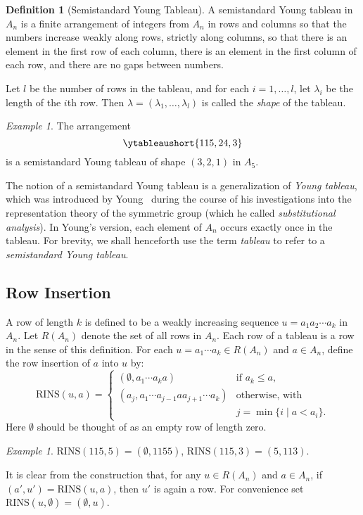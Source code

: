 \documentclass[10pt]{amsproc}
\theoremstyle{definition}
\newtheorem{definition}[theorem]{Definition}
\theoremstyle{remark}
\newtheorem{example}[theorem]{Example}
\newcommand{\rowins}{\mathrm{RINS}}
\begin{document}
\begin{definition}
  [Semistandard Young Tableau]
  \label{definition:ssyt}
  A semistandard Young \linebreak tableau in $A_n$ is a finite arrangement of integers from $A_n$ in rows and columns so that the numbers increase weakly along rows, strictly along columns, so that there is an element in the first row of each column, there is an element in the first column of each row, and there are no gaps between numbers.

  Let $l$ be the number of rows in the tableau, and for each $i=1,\dotsc,l$, let $\lambda_i$ be the length of the $i$th row.
  Then $\lambda=(\lambda_1,\dotsc,\lambda_l)$ is called the \emph{shape} of the tableau.
\end{definition}
\begin{example}
  \label{example:ssyt}
  The arrangement
  \begin{displaymath}
    \ytableaushort{115,24,3}
  \end{displaymath}
  is a semistandard Young tableau of shape $(3,2,1)$ in $A_5$.
\end{example}

The notion of a semistandard Young tableau is a generalization of \emph{Young tableau}, which was introduced by Young~\cite[p.~133]{doi:10.1112/plms/s1-33.1.97} during the course of his investigations into the representation theory of the symmetric group (which he called \emph{substitutional analysis}).
In Young's version, each element of $A_n$ occurs exactly once in the tableau.
For brevity, we shall henceforth use the term \emph{tableau} to refer to a \emph{semistandard Young tableau}.
\subsection{Row Insertion}
\label{sec:row-insertion}A row of length $k$ is defined to be a weakly increasing sequence $u=a_1a_2\dotsb a_k$ in $A_n$.
Let $R(A_n)$ denote the set of all rows in $A_n$.
Each row of a tableau is a row in the sense of this definition.
For each $u=a_1\dotsb a_k\in R(A_n)$ and $a\in A_n$, define the row insertion of $a$ into $u$ by:
\begin{displaymath}
  \rowins(u,a) =
  \begin{cases}
    (\emptyset, a_1\dotsb a_k a) & \text{if } a_k\leq a,\\
    (a_j,a_1\dotsb a_{j-1}aa_{j+1}\dotsb a_k) & \text{otherwise, with}\\
    & j=\min\{i\mid a<a_i\}.
  \end{cases}
\end{displaymath}
Here $\emptyset$ should be thought of as an empty row of length zero.
\begin{example}
  $\rowins(115,5) = (\emptyset,1155)$, $\rowins(115,3)=(5,113)$.
\end{example}
It is clear from the construction that, for any $u\in R(A_n)$ and $a\in A_n$, if $(a',u')=\rowins(u,a)$, then $u'$ is again a row.
For convenience set $\rowins(u,\emptyset)=(\emptyset,u)$.
\end{document}
